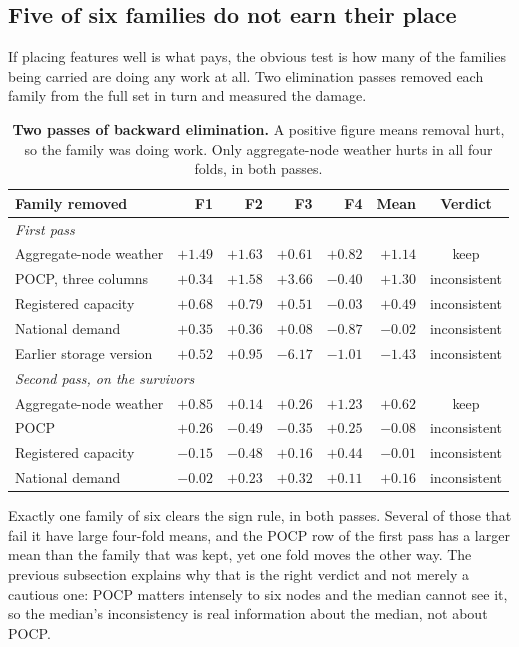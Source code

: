 \subsection{Five of six families do not earn their place}

If placing features well is what pays, the obvious test is how many of the families being
carried are doing any work at all. Two elimination passes removed each family from the full
set in turn and measured the damage.

\begin{table}[htp]
\centering
\begin{tabular}{lrrrrrc}
\toprule
{\bf Family removed} & {\bf F1} & {\bf F2} & {\bf F3} & {\bf F4} & {\bf Mean} & {\bf Verdict} \\
\midrule
\multicolumn{7}{l}{\emph{First pass}} \\
Aggregate-node weather & $+1.49$ & $+1.63$ & $+0.61$ & $+0.82$ & $+1.14$ & keep \\
POCP, three columns & $+0.34$ & $+1.58$ & $+3.66$ & $-0.40$ & $+1.30$ & inconsistent \\
Registered capacity & $+0.68$ & $+0.79$ & $+0.51$ & $-0.03$ & $+0.49$ & inconsistent \\
National demand & $+0.35$ & $+0.36$ & $+0.08$ & $-0.87$ & $-0.02$ & inconsistent \\
Earlier storage version & $+0.52$ & $+0.95$ & $-6.17$ & $-1.01$ & $-1.43$ & inconsistent \\
\midrule
\multicolumn{7}{l}{\emph{Second pass, on the survivors}} \\
Aggregate-node weather & $+0.85$ & $+0.14$ & $+0.26$ & $+1.23$ & $+0.62$ & keep \\
POCP & $+0.26$ & $-0.49$ & $-0.35$ & $+0.25$ & $-0.08$ & inconsistent \\
Registered capacity & $-0.15$ & $-0.48$ & $+0.16$ & $+0.44$ & $-0.01$ & inconsistent \\
National demand & $-0.02$ & $+0.23$ & $+0.32$ & $+0.11$ & $+0.16$ & inconsistent \\
\bottomrule
\end{tabular}
\caption[Backward elimination]{\textbf{Two passes of backward elimination.} A positive
figure means removal hurt, so the family was doing work. Only aggregate-node weather hurts
in all four folds, in both passes.}
\label{tab:backward}
\end{table}

Exactly one family of six clears the sign rule, in both passes. Several of those that fail
it have large four-fold means, and the POCP row of the first pass has a larger mean than the
family that was kept, yet one fold moves the other way. The previous subsection explains
why that is the right verdict and not merely a cautious one: POCP matters intensely to six
nodes and the median cannot see it, so the median's inconsistency is real information about
the median, not about POCP.

